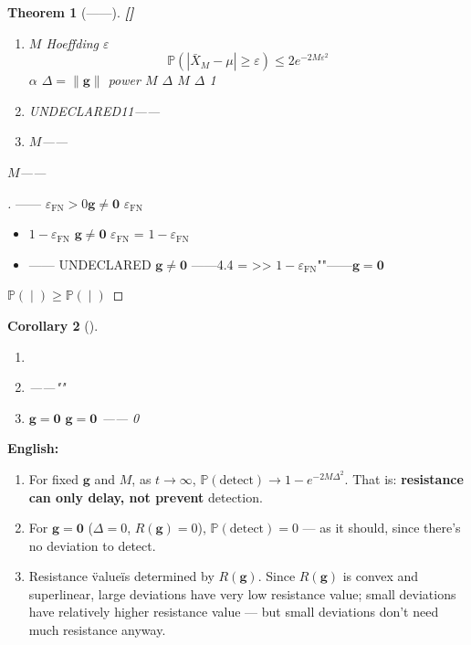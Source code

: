 \documentclass[12pt,a4paper]{article}
\newtheorem{theorem}{Theorem}[section]
\newtheorem{corollary}[theorem]{Corollary}
\theoremstyle{remark}
\newcommand{\Pbb}{\mathbb{P}}
\newcommand{\g}{\mathbf{g}}
\newcommand{\rigorPartial}{\textnormal{\textbf{[]}}}
\begin{document}
\begin{theorem}[——]\label{thm:detection_prob}\rigorPartial

\begin{enumerate}[label=(\roman*)]
    \item \textbf{}  $ M $ Hoeffding $ \varepsilon $ 
    \begin{equation}
        \Pbb(|\bar{X}_M - \mu| \geq \varepsilon) \leq 2e^{-2M\varepsilon^2}
        \label{eq:hoeffding_correct}
    \end{equation}
     $ \alpha $  $ \Delta = \|\g\| $ power $ M $  $ \Delta $ $ M $  $ \Delta $ 1

    \item \textbf{} UNDECLARED11——

    \item \textbf{}  $ M $——
\end{enumerate}

\textbf{}  $ M $——
\end{theorem}

\begin{proof}[]
—— $ \varepsilon_{\text{FN}} > 0 $$ \g \neq \mathbf{0} $  $ \varepsilon_{\text{FN}} $ 
\begin{itemize}
    \item \textbf{}  $ 1 - \varepsilon_{\text{FN}} $  $ \g \neq \mathbf{0} $ $ \varepsilon_{\text{FN}} $  = $ 1 - \varepsilon_{\text{FN}} $
    \item \textbf{} —— UNDECLARED $ \g \neq \mathbf{0} $ ——4.4 =  >> $ 1 - \varepsilon_{\text{FN}} $""——$ \g = \mathbf{0} $ 
\end{itemize}

 $ \Pbb(\text{} \mid \text{}) \geq \Pbb(\text{} \mid \text{}) $ 
\end{proof}

\begin{corollary}[]
\begin{enumerate}[label=(\roman*)]
    \item \textbf{} 
    \item \textbf{} ——""
    \item \textbf{$ \g = \mathbf{0} $ }  $ \g = \mathbf{0} $ —— 0
\end{enumerate}
\end{corollary}

\vspace{4pt}
\noindent
\textbf{English:}
\begin{enumerate}[label=(\roman*)]
    \item For fixed $ \g $ and $ M $, as $ t \to \infty $, $ \Pbb(\text{detect}) \to 1 - e^{-2M\Delta^2} $. That is: \textbf{resistance can only delay, not prevent} detection.
    \item For $ \g = \mathbf{0} $ ($ \Delta = 0 $, $ R(\g) = 0 $), $ \Pbb(\text{detect}) = 0 $ — as it should, since there's no deviation to detect.
    \item Resistance \"value\" is determined by $ R(\g) $. Since $ R(\g) $ is convex and superlinear, large deviations have very low resistance value; small deviations have relatively higher resistance value — but small deviations don't need much resistance anyway.
\end{enumerate}
\end{document}
